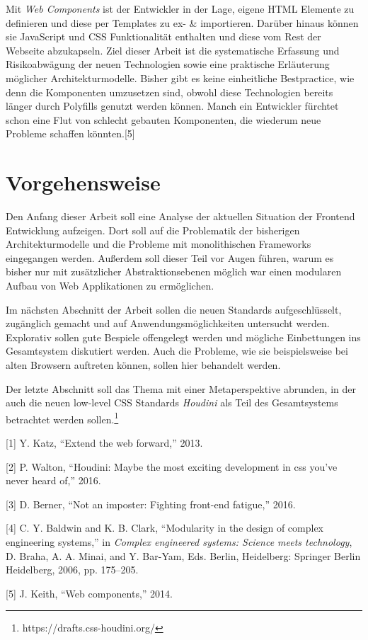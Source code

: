 Mit \emph{Web Components} ist der Entwickler in der Lage, eigene HTML
Elemente zu definieren und diese per Templates zu ex- \& importieren.
Darüber hinaus können sie JavaScript und CSS Funktionalität enthalten
und diese vom Rest der Webseite abzukapseln. Ziel dieser Arbeit ist die
systematische Erfassung und Risikoabwägung der neuen Technologien sowie
eine praktische Erläuterung möglicher Architekturmodelle. Bisher gibt es
keine einheitliche Bestpractice, wie denn die Komponenten umzusetzen
sind, obwohl diese Technologien bereits länger durch Polyfills genutzt
werden können. Manch ein Entwickler fürchtet schon eine Flut von
schlecht gebauten Komponenten, die wiederum neue Probleme schaffen
könnten.{[}5{]}

\section{Vorgehensweise}\label{vorgehensweise}

Den Anfang dieser Arbeit soll eine Analyse der aktuellen Situation der
Frontend Entwicklung aufzeigen. Dort soll auf die Problematik der
bisherigen Architekturmodelle und die Probleme mit monolithischen
Frameworks eingegangen werden. Außerdem soll dieser Teil vor Augen
führen, warum es bisher nur mit zusätzlicher Abstraktionsebenen möglich
war einen modularen Aufbau von Web Applikationen zu ermöglichen.

Im nächsten Abschnitt der Arbeit sollen die neuen Standards
aufgeschlüsselt, zugänglich gemacht und auf Anwendungsmöglichkeiten
untersucht werden. Explorativ sollen gute Bespiele offengelegt werden
und mögliche Einbettungen ins Gesamtsystem diskutiert werden. Auch die
Probleme, wie sie beispielsweise bei alten Browsern auftreten können,
sollen hier behandelt werden.

Der letzte Abschnitt soll das Thema mit einer Metaperspektive abrunden,
in der auch die neuen low-level CSS Standards \emph{Houdini} als Teil
des Gesamtsystems betrachtet werden sollen.\footnote{https://drafts.css-houdini.org/}

\hypertarget{refs}{}
\hypertarget{ref-Katz2013}{}
{[}1{]} Y. Katz, ``Extend the web forward,'' 2013.

\hypertarget{ref-Walton2016}{}
{[}2{]} P. Walton, ``Houdini: Maybe the most exciting development in css
you've never heard of,'' 2016.

\hypertarget{ref-Berner2016}{}
{[}3{]} D. Berner, ``Not an imposter: Fighting front-end fatigue,''
2016.

\hypertarget{ref-Baldwin2006}{}
{[}4{]} C. Y. Baldwin and K. B. Clark, ``Modularity in the design of
complex engineering systems,'' in \emph{Complex engineered systems:
Science meets technology}, D. Braha, A. A. Minai, and Y. Bar-Yam, Eds.
Berlin, Heidelberg: Springer Berlin Heidelberg, 2006, pp. 175--205.

\hypertarget{ref-Keith2014}{}
{[}5{]} J. Keith, ``Web components,'' 2014.
